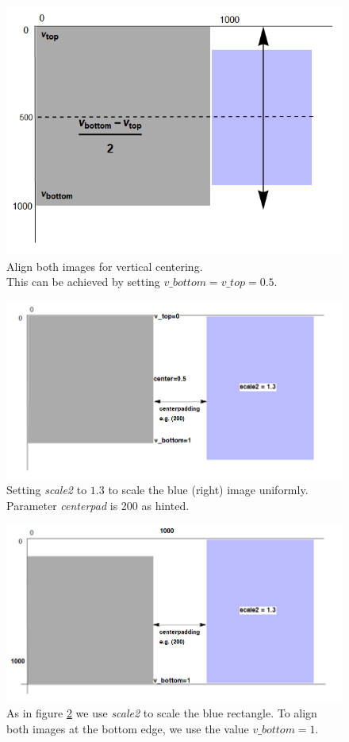 \documentclass[a4paper, 12pt, bibliography=totoc]{scrartcl}
\begin{document}
\begin{figure}[H]
	\centering
	\includegraphics[width=0.8\linewidth]{images/svgjoinpad0centered.png}
	\caption{Align both images for vertical centering. \\
		This can be achieved by setting $v\_bottom=v\_top=0.5$.}
	\label{fig:svgjoinpad0centered}
\end{figure}

\begin{figure}[H]
	\centering
	\includegraphics[width=0.8\linewidth]{images/svgjoinscaled.png}
	\caption{Setting \textit{scale2} to $1.3$ to scale the blue (right) image uniformly. Parameter \textit{centerpad} is 200 as hinted.}
	\label{fig:svgjoinscaled}
\end{figure}

\begin{figure}[H]
	\centering
	\includegraphics[width=0.8\linewidth]{images/svgjoinscaledbottom.png}
	\caption{As in figure \ref{fig:svgjoinscaled} we use \textit{scale2} to scale the blue rectangle. To align both images at the bottom edge, we use the value $v\_bottom=1$.}
	\label{fig:svgjoinscaledbottom}
\end{figure}
\end{document}
